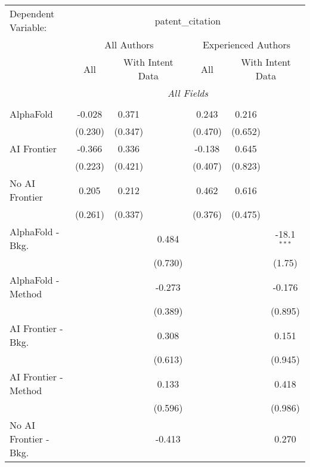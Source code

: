 \begingroup
\centering
\begin{tabular}{lcccccc}
   \tabularnewline \midrule \midrule
   Dependent Variable: & \multicolumn{6}{c}{patent\_citation}\\
 & \multicolumn{3}{c}{All Authors} & \multicolumn{3}{c}{Experienced Authors} \\
\cmidrule(lr){2-4} \cmidrule(lr){5-7}
 & \multicolumn{1}{c}{All} & \multicolumn{2}{c}{With Intent Data} & \multicolumn{1}{c}{All} & \multicolumn{2}{c}{With Intent Data} \\
\cmidrule(lr){2-2} \cmidrule(lr){3-4} \cmidrule(lr){5-5} \cmidrule(lr){6-7}
 & \multicolumn{6}{c}{\textit{All Fields}} \\ \\
   AlphaFold               & -0.028  & 0.371   &         & 0.243   & 0.216   &   \\   
                           & (0.230) & (0.347) &         & (0.470) & (0.652) &   \\   
   AI Frontier             & -0.366  & 0.336   &         & -0.138  & 0.645   &   \\   
                           & (0.223) & (0.421) &         & (0.407) & (0.823) &   \\   
   No AI Frontier          & 0.205   & 0.212   &         & 0.462   & 0.616   &   \\   
                           & (0.261) & (0.337) &         & (0.376) & (0.475) &   \\   
   AlphaFold - Bkg.        &         &         & 0.484   &         &         & -18.1$^{***}$\\   
                           &         &         & (0.730) &         &         & (1.75)\\   
   AlphaFold - Method      &         &         & -0.273  &         &         & -0.176\\   
                           &         &         & (0.389) &         &         & (0.895)\\   
   AI Frontier - Bkg.      &         &         & 0.308   &         &         & 0.151\\   
                           &         &         & (0.613) &         &         & (0.945)\\   
   AI Frontier - Method    &         &         & 0.133   &         &         & 0.418\\   
                           &         &         & (0.596) &         &         & (0.986)\\   
   No AI Frontier - Bkg.   &         &         & -0.413  &         &         & 0.270\\   

\end{tabular}
